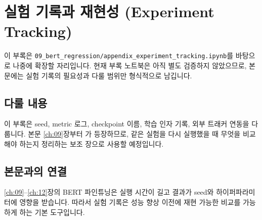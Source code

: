 \chapter{실험 기록과 재현성 (Experiment Tracking)}

\begin{noteBox}[부록 원고 상태]
이 부록은 \texttt{09\_bert\_regression/appendix\_experiment\_tracking.ipynb}를 바탕으로 나중에 확장할 자리입니다. 현재 부록 노트북은 아직 별도 검증하지 않았으므로, 본문에는 실험 기록의 필요성과 다룰 범위만 형식적으로 남깁니다.
\end{noteBox}

\section*{다룰 내용}

이 부록은 seed, metric 로그, checkpoint 이름, 학습 인자 기록, 외부 트래커 연동을 다룹니다. 본문 \ref{ch:09}장부터 가 등장하므로, 같은 실험을 다시 실행했을 때 무엇을 비교해야 하는지 정리하는 보조 장으로 사용할 예정입니다.

\section*{본문과의 연결}

\ref{ch:09}--\ref{ch:12}장의 BERT 파인튜닝은 실행 시간이 길고 결과가 seed와 하이퍼파라미터에 영향을 받습니다. 따라서 실험 기록은 성능 향상 이전에 재현 가능한 비교를 가능하게 하는 기본 도구입니다.

